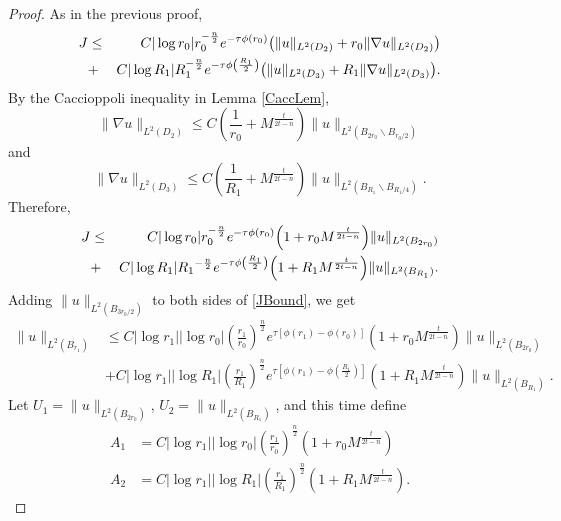 \documentclass[11pt]{amsart}
\theoremstyle{plain}
\numberwithin{equation}{section}
\begin{document}
\begin{proof}
As in the previous proof,
\begin{eqnarray*}
J &\leq & C |\log r_0| r_0^{-\frac{n}{2}} e^{-\tau \phi(r_0)}  {\left( {\| u\|_{{L^2(D_2)}}+ r_0
\|\nabla u\|_{{L^2(D_2)}}} \right) } \nonumber \medskip \\
&+& C|\log R_1| R_1^{-\frac{n}{2}}e^{-\tau \phi{\left( {\frac{R_1}{2}} \right) }} {\left( {\|
u\|_{{L^2(D_3)}}+ R_1 \| \nabla u\|_{{L^2(D_3)}}} \right) }.
\end{eqnarray*}
By the Caccioppoli inequality in Lemma \ref{CaccLem},
\begin{equation*}
\|\nabla u\|_{L^2(D_2)}\leq
C{\left( {\frac{1}{r_0}+M^{\frac{t}{2t-n}}} \right) }\|
u\|_{L^2{\left( {B_{2r_0}\backslash B_{{r_0}/{2}}} \right) }}
\end{equation*}
and
\begin{equation*}
\|\nabla u\|_{L^2(D_3)}\leq
C{\left( {\frac{1}{R_1}+M^{\frac{t}{2t-n}}} \right) }\|
u\|_{L^2{\left( {B_{R_1}\backslash B_{{R_1}/{4}}} \right) }}.
\end{equation*}
Therefore,
\begin{eqnarray*}
J
&\leq& C |\log r_0| r_0^{-\frac{n}{2}}e^{-\tau \phi(r_0)}{\left( {1+r_0M^{\frac{t}{2t-n}}} \right) }\|u\|_{L^2(B_{2r_0})}  \nonumber \medskip \\
&+& C |\log R_1| {R_1}^{-\frac{n}{2}}e^{-\tau \phi{\left( {\frac{R_1}{2}} \right) }}{\left( {1+R_1M^{\frac{t}{2t-n}}} \right) }
\|u\|_{L^2(B_{R_1})}.
\end{eqnarray*}
Adding $\|u\|_{L^2 {\left( {B_{3r_0/2}} \right) }}$ to both sides of \eqref{JBound}, we get
\begin{align*}
\| u\|_{L^2 (B_{r_1})}
&\le C |\log r_1|  |\log r_0| {\left( {\frac{r_1}{r_0}} \right) }^{\frac{n}{2}}e^{\tau {\left[{\phi(r_1)- \phi(r_0)}\right]}}{\left( {1+ r_0M^{\frac{t}{2t-n}}} \right) }\|u\|_{L^2(B_{2r_0})} \\
&+ C |\log r_1| |\log R_1| {\left( {\frac{r_1}{R_1}} \right) }^{\frac{n}{2}}e^{\tau{\left[{\phi(r_1) -
\phi{\left( {\frac{R_1}{2}} \right) }}\right]}}{\left( {1+R_1M^{\frac{t}{2t-n}}} \right) } \|u\|_{L^2(B_{R_1})}.
\end{align*}
Let $U_1 =\|u\|_{L^2(B_{2r_0})}$, $U_2=\|u\|_{L^2(B_{R_1})}$, and this time define
\begin{align*}
A_1 &= C |\log r_1|  |\log r_0| {\left( {\frac{r_1}{r_0}} \right) }^{\frac{n}{2}} {\left( {1+r_0M^{\frac{t}{2t-n}}} \right) } \\
A_2 &= C |\log r_1| |\log R_1| {\left( {\frac{r_1}{R_1}} \right) }^{\frac{n}{2}} {\left( {1+R_1M^{\frac{t}{2t-n}}} \right) }.

\end{align*}
\end{proof}
\end{document}
